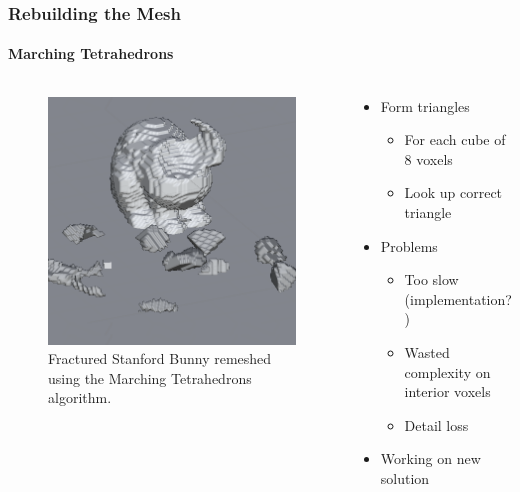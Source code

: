\documentclass{beamer}
\begin{document}
	\begin{frame}
	\frametitle{Rebuilding the Mesh}
	\framesubtitle{Marching Tetrahedrons}
		\begin{columns}[T] %
			\begin{column}[T]{5cm} %
				\begin{figure}
					\centerline{\includegraphics[scale=0.4]{Marching.png}}
					\caption{Fractured Stanford Bunny remeshed using the Marching Tetrahedrons algorithm.}
				\end{figure}
			\end{column}
			\begin{column}[T]{5cm} %
				\begin{itemize}
				\item{Form triangles}
					\begin{itemize}
						\item{For each cube of 8 voxels}
						\item{Look up correct triangle}
					\end{itemize}
				\item{Problems}
					\begin{itemize}
						\item{Too slow (implementation?)}
						\item{Wasted complexity on interior voxels}
						\item{Detail loss}
					\end{itemize}
				\item{Working on new solution}
				\end{itemize}
			\end{column}
		\end{columns}
	\end{frame}
\end{document}
